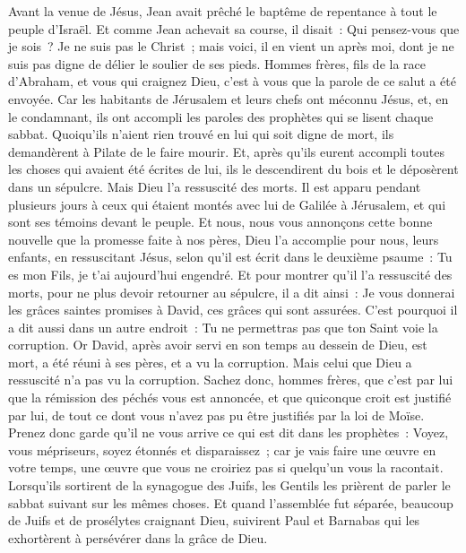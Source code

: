 \begin{multicols}{2}
Avant la venue de Jésus, Jean avait prêché le baptême de repentance à tout le peuple d'Israël.
Et comme Jean achevait sa course, il disait~: Qui pensez-vous que je sois~? Je ne suis pas le Christ~; mais voici, il en vient un après moi, dont je ne suis pas digne de délier le soulier de ses pieds.
Hommes frères, fils de la race d'Abraham, et vous qui craignez Dieu, c'est à vous que la parole de ce salut a été envoyée.
Car les habitants de Jérusalem et leurs chefs ont méconnu Jésus, et, en le condamnant, ils ont accompli les paroles des prophètes qui se lisent chaque sabbat.
Quoiqu'ils n'aient rien trouvé en lui qui soit digne de mort, ils demandèrent à Pilate de le faire mourir.
Et, après qu'ils eurent accompli toutes les choses qui avaient été écrites de lui, ils le descendirent du bois et le déposèrent dans un sépulcre.
Mais Dieu l'a ressuscité des morts.
Il est apparu pendant plusieurs jours à ceux qui étaient montés avec lui de Galilée à Jérusalem, et qui sont ses témoins devant le peuple.
Et nous, nous vous annonçons cette bonne nouvelle que la promesse faite à nos pères,
Dieu l'a accomplie pour nous, leurs enfants, en ressuscitant Jésus, selon qu'il est écrit dans le deuxième psaume~: Tu es mon Fils, je t'ai aujourd'hui engendré.
Et pour montrer qu'il l'a ressuscité des morts, pour ne plus devoir retourner au sépulcre, il a dit ainsi~: Je vous donnerai les grâces saintes promises à David, ces grâces qui sont assurées.
C'est pourquoi il a dit aussi dans un autre endroit~: Tu ne permettras pas que ton Saint voie la corruption.
Or David, après avoir servi en son temps au dessein de Dieu, est mort, a été réuni à ses pères, et a vu la corruption.
Mais celui que Dieu a ressuscité n'a pas vu la corruption.
Sachez donc, hommes frères, que c'est par lui que la rémission des péchés vous est annoncée,
et que quiconque croit est justifié par lui, de tout ce dont vous n'avez pas pu être justifiés par la loi de Moïse.
Prenez donc garde qu'il ne vous arrive ce qui est dit dans les prophètes~:
Voyez, vous mépriseurs, soyez étonnés et disparaissez~; car je vais faire une œuvre en votre temps, une œuvre que vous ne croiriez pas si quelqu'un vous la racontait.
Lorsqu'ils sortirent de la synagogue des Juifs, les Gentils les prièrent de parler le sabbat suivant sur les mêmes choses.
Et quand l'assemblée fut séparée, beaucoup de Juifs et de prosélytes craignant Dieu, suivirent Paul et Barnabas qui les exhortèrent à persévérer dans la grâce de Dieu.

\end{multicols}
